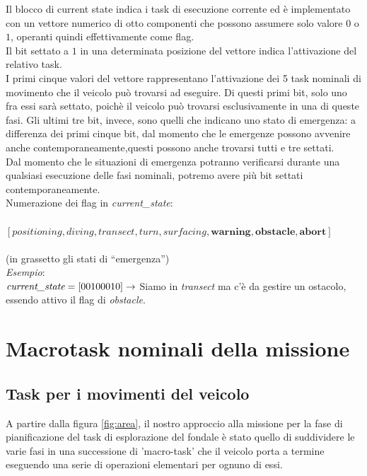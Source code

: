 \documentclass{article}
\begin{document}
        Il blocco di current state indica i task di esecuzione corrente ed è implementato con un vettore numerico di otto componenti
        che possono assumere solo valore $0$ o $1$, operanti quindi effettivamente come flag.\\
        Il bit settato a $1$ in una determinata posizione del vettore indica l'attivazione del relativo task. \\
        I primi cinque valori del vettore rappresentano l'attivazione dei 5 task nominali di movimento che il veicolo può trovarsi ad eseguire. 
        Di questi primi bit, solo uno fra essi sarà settato, poichè il veicolo può trovarsi esclusivamente 
        in una di queste fasi. Gli ultimi tre bit, invece, sono quelli che indicano 
        uno stato di emergenza: a differenza dei primi cinque bit, dal momento che le emergenze possono avvenire anche contemporaneamente,questi
        possono anche trovarsi tutti e tre settati. \\
        Dal momento che le situazioni di emergenza potranno verificarsi durante una qualsiasi esecuzione delle fasi nominali, potremo avere più bit settati 
        contemporaneamente.\\

        Numerazione dei flag in  \emph{current\_state}:\\
        \\
        $[positioning, diving, transect, turn, surfacing, \textbf{warning}, \textbf{obstacle}, \textbf{abort}]$ \\
        \\(in grassetto gli stati di “emergenza”)\\

        \textit{Esempio}: \\
        $ \emph{current\_state}=[0 0 1 0 0 0 1 0] \rightarrow$
        Siamo in \emph{transect} ma c’è da gestire un ostacolo, essendo attivo il flag di \emph{obstacle}.\\
        
        \newpage
        \section{Macrotask nominali della missione}
            \subsection{Task per i movimenti del veicolo}
                A partire dalla figura \ref{fig:area}, il nostro approccio alla missione per la fase di pianificazione
                del task di esplorazione del fondale è stato quello di suddividere le varie fasi in una successione di 'macro-task' che il veicolo porta a termine
                eseguendo una serie di operazioni elementari per ognuno di essi.\\
\end{document}
